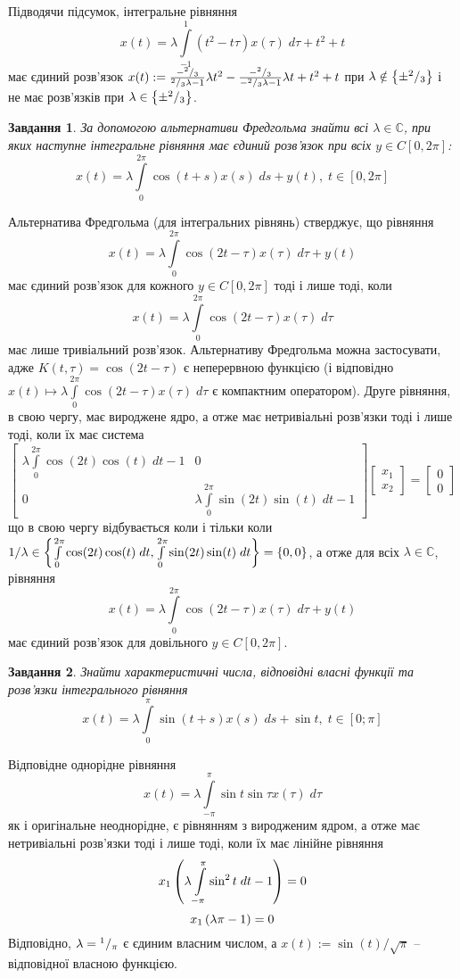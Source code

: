 \documentclass[10pt]{article}
\newtheorem{prob}{Завдання}
\newcommand{\ds}{\;ds}
\newcommand{\dt}{\;dt}
\let\oldint\int
\renewcommand{\int}{\oldint\limits}
\begin{document}
		Підводячи підсумок, інтегральне рівняння
		\[x(t)=\lambda\int_{-1}^1(t^2-t\tau)x(\tau)\;d\tau+t^2+t\]
		має єдиний розв’язок $x(t):=\frac{-{^{2}/_{3}}}{{^{2}/_{3}}\lambda-1}\lambda t^2-\frac{-{^{2}/_{3}}}{-{^{2}/_{3}}\lambda-1}
		\lambda t+t^2+t$ при $\lambda\notin\left\{\pm{^{2}/_{3}}\right\}$ і не має розв’язків при $\lambda\in\left\{\pm{^{2}/_{3}}\right\}$.
\begin{prob}За допомогою альтернативи Фредгольма знайти всі $\lambda\in\mathbb{C}$, при яких наступне інтегральне рівняння
	має єдиний розв’язок при всіх $y\in C[0,2\pi]$:
	\[x(t)=\lambda\int_0^{2\pi}\cos(t+s)x(s)\ds+y(t),\;t\in[0,2\pi]\]
\end{prob}
Альтернатива Фредгольма (для інтегральних рівнянь) стверджує, що рівняння 
\[x(t)=\lambda\int_0^{2\pi}\cos(2t-\tau)x(\tau)\;d\tau+y(t)\]
має єдиний розв’язок для кожного $y\in C[0,2\pi]$ тоді і лише тоді, коли
\[x(t)=\lambda\int_0^{2\pi}\cos(2t-\tau)x(\tau)\;d\tau\]
має лише тривіальний розв’язок. Альтернативу Фредгольма можна застосувати, адже $K(t,\tau)=\cos(2t-\tau)$ є неперервною функцією 
(і відповідно $x(t)\mapsto\lambda\int_0^{2\pi}\cos(2t-\tau)x(\tau)\;d\tau$ є компактним оператором). Друге рівняння, в свою чергу, має вироджене
ядро, а отже має нетривіальні розв’язки тоді і лише тоді, коли їх має система
\[\begin{bmatrix}\lambda\int_0^{2\pi}\cos(2t)\cos(t)\;dt-1&0\\0&\lambda\int_0^{2\pi}\sin(2t)\sin(t)\;dt-1\end{bmatrix}
	\begin{bmatrix}x_1\\x_2\end{bmatrix}=\begin{bmatrix}0\\0\end{bmatrix}\]
		що в свою чергу відбувається коли і тільки коли $1/\lambda\in\mycbra{{\int_0^{2\pi}\cos(2t)\cos(t)\;dt},
		{\int_0^{2\pi}\sin(2t)\sin(t)\;dt}}=\mycbra{0,0}$, а отже для всіх $\lambda\in\mathbb{C}$, рівняння
		\[x(t)=\lambda\int_0^{2\pi}\cos(2t-\tau)x(\tau)\;d\tau+y(t)\]
		має єдиний розв’язок для довільного $y\in C[0,2\pi]$. 
\begin{prob}
	Знайти характеристичні числа, відповідні власні функції та розв’язки інтегрального рівняння
	\[x(t)=\lambda\int_{0}^{\pi}\sin(t+s) x(s)\ds+\sin t,\;t\in[0;\pi]\]
\end{prob}
	Відповідне однорідне рівняння
	\[x(t)=\lambda\int_{-\pi}^{\pi}\sin t\sin\tau x(\tau)\;d\tau\]
	як і оригінальне неоднорідне, є рівнянням з виродженим ядром, а отже має нетривіальні розв’язки тоді і лише тоді, коли їх має лінійне
	рівняння
	\[x_1\mybra{\lambda\int_{-\pi}^\pi\sin^2 t\dt-1}=0\]
	\[x_1\left(\lambda\pi-1\right)=0\]
	Відповідно, $\lambda={^{1}/_{\pi}}$ є єдиним власним числом, а $x(t):=\sin(t)/\sqrt{\pi}$ -- відповідної власною функцією.
\end{document}
